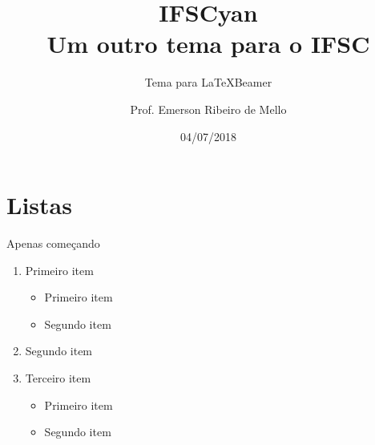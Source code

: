 \documentclass{beamer}
\title{IFSCyan \\ Um outro tema para o IFSC}
\subtitle{Tema para \LaTeX Beamer}
\author{Prof. Emerson Ribeiro de Mello}
\institute{
\url{mello@ifsc.edu.br}}
\date{04/07/2018}
\let\olditem\item
\renewcommand{\item}{%
\olditem\vspace{\fill}}
\begin{document}
\begin{frame}[t]
	\maketitle
\end{frame}

\section{Listas}

\begin{frame}{Apenas começando}
	\begin{enumerate}
		\item Primeiro item
		\begin{itemize}
			\item Primeiro item
			\item Segundo item
		\end{itemize}
		\item Segundo item
		\item Terceiro item 
		\begin{itemize}
			\item Primeiro item
			\item Segundo item
		\end{itemize}
	\end{enumerate}
\end{frame}
\end{document}
